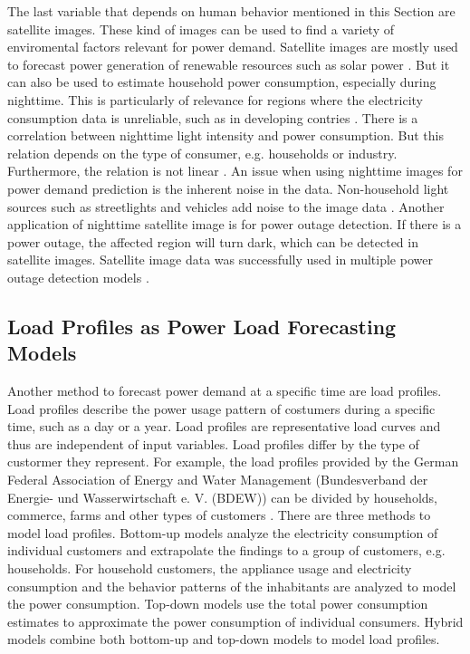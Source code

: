 The last variable that depends on human behavior mentioned in this Section are
satellite images. These kind of images can be used to find a variety 
of enviromental factors relevant for power demand.
Satellite images are mostly used to forecast power generation of 
renewable resources such as solar power \cite{solarprediction}.
But it can also be used to estimate household power consumption,
especially during nighttime. This is particularly of relevance for regions 
where the electricity consumption data is unreliable, such as in developing contries
\cite{reviewnighttime}. There is a correlation 
between nighttime light intensity and power consumption.
But this relation depends on the type of consumer, e.g. households or industry. 
Furthermore, the relation is not linear \cite{nighttimepowerestimation}. 
An issue when using nighttime images for power demand prediction is 
the inherent noise in the data. Non-household light sources such as 
streetlights and vehicles add noise to the image data \cite{reviewnighttime}.
Another application of nighttime satellite image is for power outage detection.
If there is a power outage, the affected region will turn dark, which 
can be detected in satellite images. Satellite image data 
was successfully used in multiple power outage detection models
\cite{nightpoweroutage} \cite{twitterpoweroutagelighttime}.

\subsection{Load Profiles as Power Load Forecasting Models}
Another method to forecast power demand at a specific time are load 
profiles. Load profiles describe the power usage pattern of costumers
during a specific time, such as a day or a year. Load profiles are 
representative load curves and thus are independent of input variables.
Load profiles differ by the type of custormer they represent. For 
example, the load profiles provided by the German Federal Association of 
Energy and Water Management (Bundesverband der Energie- und Wasserwirtschaft 
e. V. (BDEW)) can be divided by households, commerce, 
farms and other types of customers \cite{meier1999reprasentative}.
There are three methods to model load profiles.
Bottom-up models analyze the electricity consumption of individual customers
and extrapolate the findings to a group of customers, e.g. households.
For household customers, the appliance usage and electricity consumption 
and the behavior patterns of the inhabitants are analyzed to model
the power consumption. Top-down models use the total power consumption 
estimates to approximate the power consumption of individual consumers.
Hybrid models combine both bottom-up and top-down models to model 
load profiles. 

